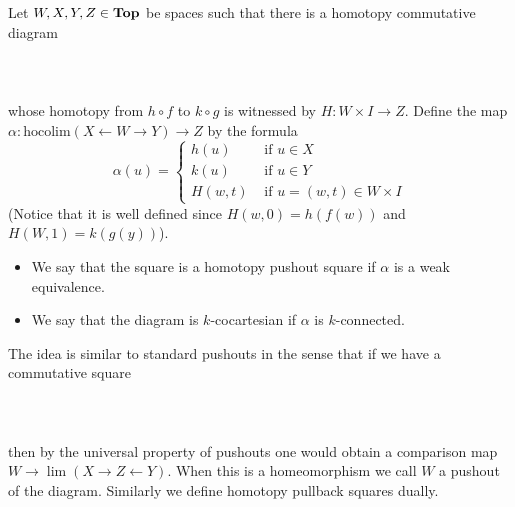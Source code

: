 \begin{defn}\label{defn:HpullSq} Let $W,X,Y,Z\in\bold{Top}$ be spaces such that there is a homotopy commutative diagram  
 \\~\\  \\~\\
whose homotopy from $h\circ f$ to $k\circ g$ is witnessed by $H:W\times I\to Z$. Define the map $\alpha:\text{hocolim}(X\leftarrow W\rightarrow Y)\to Z$ by the formula $$\alpha(u)=\begin{cases}
h(u) & \text{ if }u\in X\\
k(u) & \text{ if }u\in Y\\
H(w,t) & \text{ if }u=(w,t)\in W\times I
\end{cases}$$ (Notice that it is well defined since $H(w,0)=h(f(w))$ and $H(W,1)=k(g(y))$). 
\begin{itemize}
\item We say that the square is a homotopy pushout square if $\alpha$ is a weak equivalence. 
\item We say that the diagram is $k$-cocartesian if $\alpha$ is $k$-connected. 
\end{itemize}
\end{defn}

The idea is similar to standard pushouts in the sense that if we have a commutative square  
 \\~\\  \\~\\
then by the universal property of pushouts one would obtain a comparison map $W\to\lim(X\rightarrow Z\leftarrow Y)$. When this is a homeomorphism we call $W$ a pushout of the diagram. Similarly we define homotopy pullback squares dually. 

